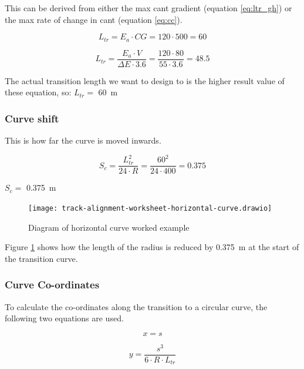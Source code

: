 \documentclass{bcrre_exam}
\begin{document}
This can be derived from either the max cant gradient (equation \ref{eq:ltr_gh}) or the max rate of change in cant (equation \ref{eq:cc}).

\begin{equation}
    \label{eq:ltr_gh}
    L_{tr} = E_a \cdot CG = 120 \cdot 500 = 60
\end{equation}

\begin{equation}
    \label{eq:cc}
    L_{tr} = \frac{E_a \cdot V}{\Delta E \cdot 3.6} = \frac{120 \cdot 80}{55 \cdot 3.6} = 48.5
\end{equation}

The actual transition length we want to design to is the higher result value of these equation, so: $L_{tr}=$ \qty{60}{m} 

\subsubsection*{Curve shift}

This is how far the curve is moved inwards.

\begin{equation}
    S_c=\frac{L_{tr}^2}{24 \cdot R} = \frac{60^2}{24 \cdot 400} = 0.375
\end{equation}

$S_c=$ \qty{0.375}{m}

\begin{figure}[h]
    \centering
    \texttt{[image: track-alignment-worksheet-horizontal-curve.drawio]}
    \caption{Diagram of horizontal curve worked example}
    \label{fig:hoz-cur-example}
\end{figure}

Figure \ref{fig:hoz-cur-example} shows how the length of the radius is reduced by \qty{0.375}{m} at the start of the transition curve.

\subsubsection*{Curve Co-ordinates}

To calculate the co-ordinates along the transition to a circular curve, the following two equations are used.

\begin{equation}
    x=s
\end{equation}

\begin{equation}
    y=\frac{s^3}{6 \cdot R \cdot L_{tr}}
\end{equation}
\end{document}
